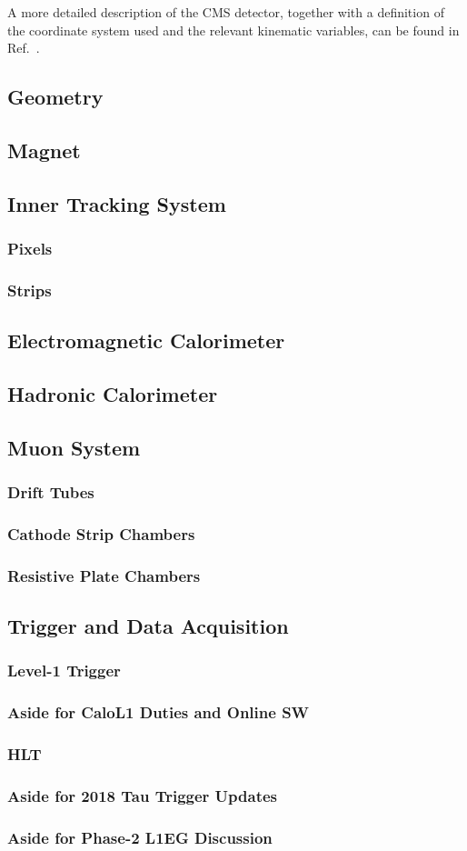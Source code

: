 A more detailed description of the CMS detector, together with a definition of the coordinate system used and the relevant kinematic variables, can be found in Ref.~\cite{Chatrchyan:2008zzk}.

\subsection{Geometry}

\subsection{Magnet}
\subsection{Inner Tracking System}
\subsubsection{Pixels}
\subsubsection{Strips}
\subsection{Electromagnetic Calorimeter}
\subsection{Hadronic Calorimeter}
\subsection{Muon System}
\subsubsection{Drift Tubes}
\subsubsection{Cathode Strip Chambers}
\subsubsection{Resistive Plate Chambers}
\subsection{Trigger and Data Acquisition}
\subsubsection{Level-1 Trigger}
\subsubsection{Aside for CaloL1 Duties and Online SW}
\subsubsection{HLT}
\subsubsection{Aside for 2018 Tau Trigger Updates}
\subsubsection{Aside for Phase-2 L1EG Discussion}
